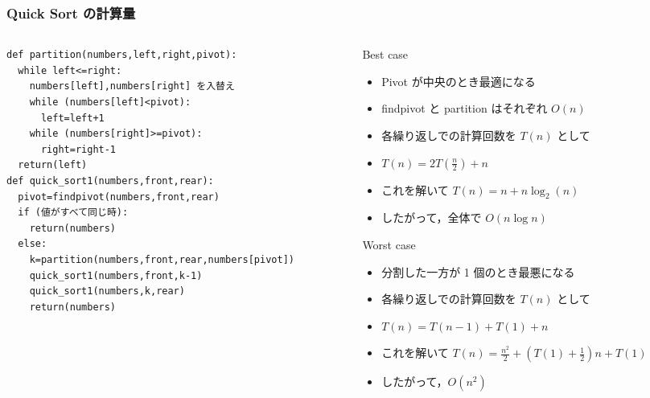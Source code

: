 \begin{frame}
\frametitle{Quick Sort の計算量}
  \begin{columns}[t,onlytextwidth]
    \begin{column}{0.45\linewidth}
      \begin{lstlisting}[caption={擬似コード},label=quick_sort]
def partition(numbers,left,right,pivot):
  while left<=right:
    numbers[left],numbers[right] を入替え
    while (numbers[left]<pivot):
      left=left+1
    while (numbers[right]>=pivot):
      right=right-1
  return(left)
def quick_sort1(numbers,front,rear):
  pivot=findpivot(numbers,front,rear)
  if (値がすべて同じ時):
    return(numbers)
  else:
    k=partition(numbers,front,rear,numbers[pivot])
    quick_sort1(numbers,front,k-1)
    quick_sort1(numbers,k,rear)
    return(numbers)
      \end{lstlisting}
    \end{column}
    \begin{column}{0.5\linewidth}
      \begin{itembox}[l]{Best case}
        \begin{itemize}
\tiny
\item Pivot が中央のとき最適になる
\item findpivot と partition はそれぞれ $O(n)$
\item 各繰り返しでの計算回数を \(T(n)\) として
\item \(T(n)=2T(\frac{n}{2})+n\)
\item これを解いて \(T(n)=n+n\log_2(n)\)
\item したがって，全体で \(O(n\log n)\) 
        \end{itemize}
      \end{itembox}
      \begin{itembox}[l]{Worst case}
        \begin{itemize}
\tiny
\item 分割した一方が 1 個のとき最悪になる
\item 各繰り返しでの計算回数を \(T(n)\) として
\item \(T(n)=T(n-1)+T(1)+n\)
\item これを解いて \(T(n)=\frac{n^2}{2}+(T(1)+\frac{1}{2})n+T(1)\)
\item したがって，\(O(n^2)\)
        \end{itemize}
      \end{itembox}
    \end{column}
  \end{columns}
\end{frame}

